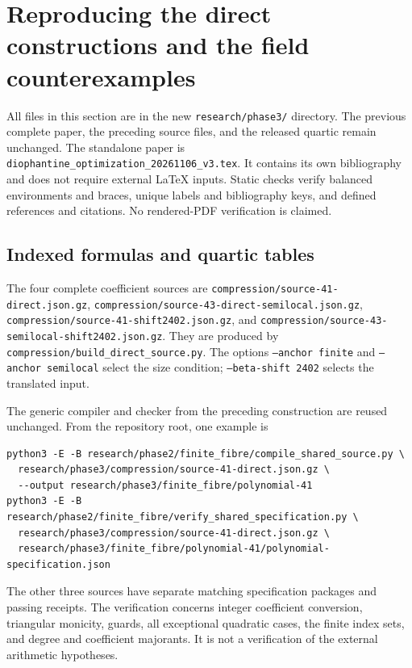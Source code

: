 \section{Reproducing the direct constructions and the field counterexamples}
\label{sec:p3-reproduction}

All files in this section are in the new
\nolinkurl{research/phase3/} directory. The previous complete paper,
the preceding source files, and the released quartic remain unchanged.
The standalone paper is
\nolinkurl{diophantine_optimization_20261106_v3.tex}.
It contains its own bibliography and does not require external
\LaTeX{} inputs. Static checks verify balanced environments and braces,
unique labels and bibliography keys, and defined references and
citations. No rendered-PDF verification is claimed.

\subsection{Indexed formulas and quartic tables}

The four complete coefficient sources are
\nolinkurl{compression/source-41-direct.json.gz},
\nolinkurl{compression/source-43-direct-semilocal.json.gz},
\nolinkurl{compression/source-41-shift2402.json.gz}, and
\nolinkurl{compression/source-43-semilocal-shift2402.json.gz}.
They are produced by \nolinkurl{compression/build_direct_source.py}.
The options \texttt{--anchor finite} and
\texttt{--anchor semilocal} select the size condition;
\texttt{--beta-shift 2402} selects the translated input.

The generic compiler and checker from the preceding construction
are reused unchanged. From the repository root, one example is
\begin{verbatim}
python3 -E -B research/phase2/finite_fibre/compile_shared_source.py \
  research/phase3/compression/source-41-direct.json.gz \
  --output research/phase3/finite_fibre/polynomial-41
python3 -E -B research/phase2/finite_fibre/verify_shared_specification.py \
  research/phase3/compression/source-41-direct.json.gz \
  research/phase3/finite_fibre/polynomial-41/polynomial-specification.json
\end{verbatim}
The other three sources have separate matching specification packages
and passing receipts. The verification concerns integer coefficient
conversion, triangular monicity, guards, all exceptional quadratic
cases, the finite index sets, and degree and coefficient majorants.
It is not a verification of the external arithmetic hypotheses.

